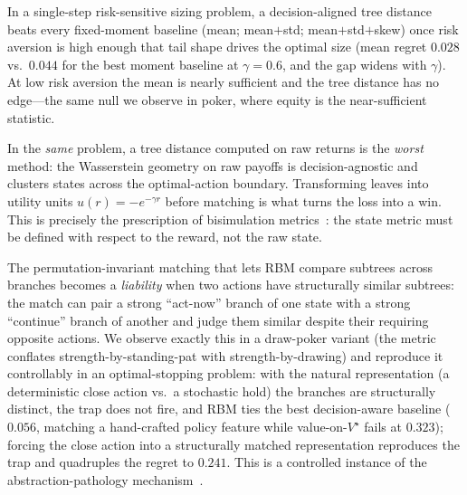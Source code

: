 \documentclass[11pt]{article}
\begin{document}
\begin{description}[leftmargin=1.2em,nosep]
\item[\textnormal{(A) The scalar value must be insufficient.}] In a
  single-step risk-sensitive sizing problem, a decision-aligned tree
  distance beats every fixed-moment baseline (mean; mean$+$std;
  mean$+$std$+$skew) once risk aversion is high enough that tail shape
  drives the optimal size (mean regret $0.028$ vs.\ $0.044$ for the
  best moment baseline at $\gamma{=}0.6$, and the gap widens with
  $\gamma$). At low risk aversion the mean is nearly sufficient and the
  tree distance has no edge---the same null we observe in poker, where
  equity is the near-sufficient statistic.
\item[\textnormal{(B) The metric must be in decision-aligned units.}]
  In the \emph{same} problem, a tree distance computed on raw returns
  is the \emph{worst} method: the Wasserstein geometry on raw payoffs
  is decision-agnostic and clusters states across the optimal-action
  boundary. Transforming leaves into utility units
  $u(r)=-e^{-\gamma r}$ before matching is what turns the loss into a
  win. This is precisely the prescription of bisimulation
  metrics~\citep{ferns2004metrics,castro2020scalable}: the state metric
  must be defined with respect to the reward, not the raw state.
\item[\textnormal{(C) Competing actions must have structurally distinct
  subtrees.}] The permutation-invariant matching that lets RBM compare
  subtrees across branches becomes a \emph{liability} when two actions
  have structurally similar subtrees: the match can pair a strong
  ``act-now'' branch of one state with a strong ``continue'' branch of
  another and judge them similar despite their requiring opposite
  actions. We observe exactly this in a draw-poker variant (the metric
  conflates strength-by-standing-pat with strength-by-drawing) and
  reproduce it controllably in an optimal-stopping problem: with the
  natural representation (a deterministic close action vs.\ a stochastic
  hold) the branches are structurally distinct, the trap does not fire,
  and RBM ties the best decision-aware baseline ($0.056$, matching a
  hand-crafted policy feature while value-on-$V^\star$ fails at
  $0.323$); forcing the close action into a structurally matched
  representation reproduces the trap and quadruples the regret to
  $0.241$. This is a controlled instance of the abstraction-pathology
  mechanism~\citep{waugh2009abstraction}.
\end{description}
\end{document}
